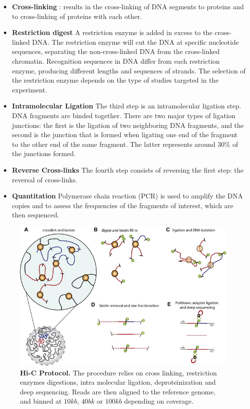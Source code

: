 \begin{itemize}
\item \textbf{Cross-linking} : results in the cross-linking of DNA segments to
proteins and to cross-linking of proteins with each other.
\item \textbf{Restriction digest} A restriction enzyme is added in excess to
the cross-linked DNA. The restriction enzyme will cut the DNA at specific
nucleotide sequences, separating the non-cross-linked DNA from the
cross-linked chromatin. Recognition sequences in DNA differ from each
restriction enzyme, producing different lengths and sequences of strands.
The selection of the restriction enzyme depends on the type of studies
targeted in the experiment.
\item \textbf{Intramolecular Ligation} The third step is an intramolecular
ligation step. DNA fragments are binded together. There are two major types
of ligation junctions: the first is the ligation of two neighboring DNA
fragments, and the second is the junction that is formed when ligating one end
of the fragment to the other end of the same fragment. The latter represents
around 30\% of the junctions formed.
\item \textbf{Reverse Cross-links} The fourth step consists of reversing the
first step: the reversal of cross-links.
\item \textbf{Quantitation} Polymerase chain reaction (PCR) is used to amplify
the DNA copies and to assess the frequencies of the fragments of interest,
which are then sequenced.
\end{itemize}

\begin{figure}
\begin{center}
\includegraphics[width=0.8\linewidth]{figures/hic_protocol.png}
\end{center}
\caption{\textbf{Hi-C Protocol.} The procedure relies on cross linking,
restriction enzymes digestions, intra molecular ligation, deproteinization and
deep sequencing. Reads are then aligned to the reference genome, and binned at
$10kb$, $40bk$ or $100kb$ depending on coverage.}
\end{figure}


